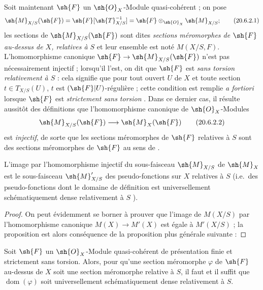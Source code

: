 \begin{env}[20.6.2]
\label{IV.20.6.2}
Soit maintenant $\sh{F}$ un $\sh{O}_X$-Module quasi-cohérent ; on pose
\[
\label{IV.20.6.2.1}
  \sh{M}_{X/S}(\sh{F})=\sh{F}[\sh{T}_{X/S}^{-1}]=\sh{F}\otimes_{\sh{O}_X}\sh{M}_{X/S};
  \tag{20.6.2.1}
\]
les sections de $\sh{M}_{X/S}(\sh{F})$ sont dites \emph{sections méromorphes de $\sh{F}$ au-dessus de $X$, relatives à $S$} et leur ensemble est noté $M(X/S,F)$.
L'homomorphisme canonique $\sh{F}\to\sh{M}_{X/S}(\sh{F})$ n'est pas nécessairement injectif ; lorsqu'il l'est, on dit que $\sh{F}$ est \emph{sans torsion relativement à $S$} : cela signifie que pour tout ouvert $U$ de $X$ et toute section $t\in T_{X/S}(U)$, $t$ est $(\sh{F}|U)$-régulière ; cette condition est remplie \emph{a fortiori} lorsque $\sh{F}$ est \emph{strictement sans torsion} .
Dans ce dernier cas, il résulte aussitôt des définitions  que l'homomorphisme canonique de $\sh{O}_X$-Modules
\[
\label{IV.20.6.2.2}
  \sh{M}_{X/S}(\sh{F})\to\sh{M}_X(\sh{F})
  \tag{20.6.2.2}
\]
est \emph{injectif}, de sorte que les sections méromorphes de $\sh{F}$ relatives à $S$ sont des sections méromorphes de $\sh{F}$ au sens de .
\end{env}

\begin{proposition}[20.6.3]
\label{IV.20.6.3}
L'image par l'homomorphisme injectif  du sous-faisceau $\sh{M}_{X/S}$ de $\sh{M}_X$ est le sous-faisceau $\sh{M}'_{X/S}$ des pseudo-fonctions sur $X$ relatives à $S$ (i.e.\ des pseudo-fonctions dont le domaine de définition est universellement schématiquement dense relativement à $S$ ).
\end{proposition}

\begin{proof}
On peut évidemment se borner à prouver que l'image de $M(X/S)$ par l'homomorphisme canonique $M(X)\to M'(X)$ est égale à $M'(X/S)$ ; la proposition est alors conséquence de la proposition plus générale suivante :
\end{proof}

\begin{proposition}[20.6.4]
\label{IV.20.6.4}
Soit $\sh{F}$ un $\sh{O}_X$-Module quasi-cohérent de présentation finie et strictement sans torsion.
Alors, pour qu'une section méromorphe $\varphi$ de $\sh{F}$ au-dessus de $X$ soit une section méromorphe relative à $S$, il faut et il suffit que $\operatorname{dom}(\varphi)$ soit universellement schématiquement dense relativement à $S$.
\end{proposition}

